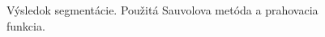 \documentclass[a4paper,11pt,oneside]{article}%
\begin{document}
\begin{figure}[H]
    \hspace{5px}
    \hspace{5px}
    \caption{Výsledok segmentácie. Použitá Sauvolova metóda a prahovacia funkcia.}
    \label{fig:sauvola_tf}
\end{figure}
\end{document}
